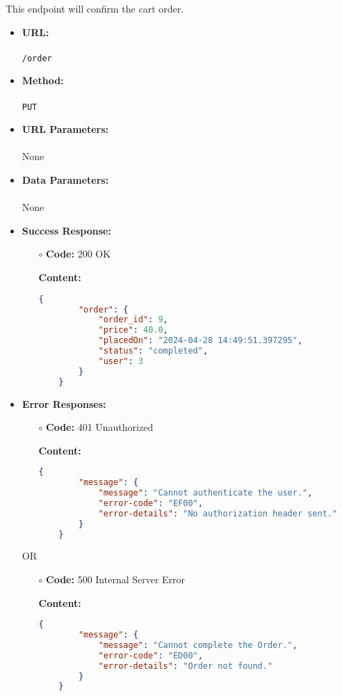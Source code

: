 

This endpoint will confirm the cart order.

\begin{itemize}
    \item \textbf{URL:} \\\\\texttt{/order}
    \item \textbf{Method:} \\\\\texttt{PUT}
    \item \textbf{URL Parameters:} \\\\None
    \item \textbf{Data Parameters:}\\\\None
    \item \textbf{Success Response:}
		\begin{itemize}
			\item[$\circ$] \textbf{Code:} 200 OK
			\item[] \textbf{Content:}
			\medskip
			\begin{lstlisting}[language=json]
	{
		"order": {
			"order_id": 9,
			"price": 40.0,
			"placedOn": "2024-04-28 14:49:51.397295",
			"status": "completed",
			"user": 3
		}
	}
			\end{lstlisting}
		\end{itemize}
	   \item \textbf{Error Responses:}
    	\begin{itemize}
			\item[$\circ$] \textbf{Code:} 401 Unauthorized
			\item[] \textbf{Content:}
			\begin{lstlisting}[language=json]
	{
		"message": {
			"message": "Cannot authenticate the user.",
			"error-code": "EF00",
			"error-details": "No authorization header sent."
		}
	}
			\end{lstlisting}
		\end{itemize}
	OR
    	\begin{itemize}
			\item[$\circ$] \textbf{Code:} 500 Internal Server Error
			\item[] \textbf{Content:}
			\begin{lstlisting}[language=json]
	{
		"message": {
			"message": "Cannot complete the Order.",
			"error-code": "ED00",
			"error-details": "Order not found."
		}
	}
			\end{lstlisting}
		\end{itemize}
    					

\end{itemize}
